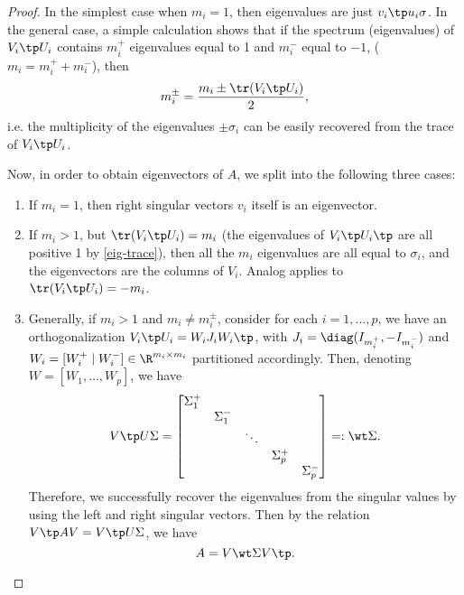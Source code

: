 \documentclass{article}
\begin{document}
\begin{proof}
In the simplest case when $m_{i} = 1$, then eigenvalues are just $v_{i}\tp
u_{i}\sigma$. In the general case, a simple calculation shows that if the
spectrum (eigenvalues) of $  V_{i}\tp   U_{i}$ contains $m_{i}^{+}$
eigenvalues equal to 1 and $m_{i}^{-}$ equal to $-1$, ($m_{i} = m_{i}^{+} +
m_{i}^{-}$), then
\begin{equation}\label{eig-trace}
  m_{i}^{\pm} = \frac{m_{i} \pm \tr(  V_{i}\tp   U_{i})}{2},
\end{equation}
i.e. the multiplicity of the eigenvalues $\pm \sigma_{i}$ can be easily
recovered from the trace of $  V_{i}\tp   U_{i}$.

Now, in order to obtain eigenvectors of $A$, we split into the following
three cases:
\begin{enumerate}
\item
If $m_{i} = 1$, then right singular vectors $v_{i}$ itself is an
eigenvector.
\item
If $m_{i} > 1$, but $\tr(  V_{i}\tp   U_{i}) = m_{i}$ (the eigenvalues
of $V_{i}\tp U_{i}\tp$ are all positive 1 by \eqref{eig-trace}), then all
the $m_{i}$ eigenvalues are all equal  to $\sigma_{i}$, and the
eigenvectors are the columns of $  V_{i}$. Analog applies to $\tr( 
V_{i}\tp   U_{i}) = -m_{i}$. 
\item
Generally, if $m_{i}>1$ and $m_{i} \neq m_{i}^{\pm}$, consider for each $i
= 1,\dots,p$, we have an orthogonalization $V_{i}\tp U_{i} =
W_{i}J_{i}W_{i}\tp$, with $J_{i} = \diag(I_{m_{i}^{+}},-I_{m_{i}^{-}})$ and
$W_{i} = [W_{i}^{+}\mid W_{i}^{-}]\in \R^{m_{i}\times m_{i}}$ partitioned
accordingly. Then, denoting $W = [W_{1},\dots,W_{p}]$, we have
\begin{equation}\notag
  V\tp U \Sigma =
  \begin{bmatrix}
    \Sigma_{1}^{+} & & & &  \\
                   & \Sigma_{1}^{-} & & & \\
                   & & \ddots & & \\
                   & & & \Sigma_{p}^{+} & \\
                   & & & & \Sigma_{p}^{-}
  \end{bmatrix} =: \wt \Sigma.
\end{equation}
Therefore, we successfully recover the eigenvalues from the singular values
by using the left and right singular vectors.
Then by the relation $V\tp A V = V\tp U \Sigma$, we have
\begin{equation}\notag
  A = V\wt\Sigma V\tp.
\end{equation}
\end{enumerate}
\end{proof}
\end{document}
